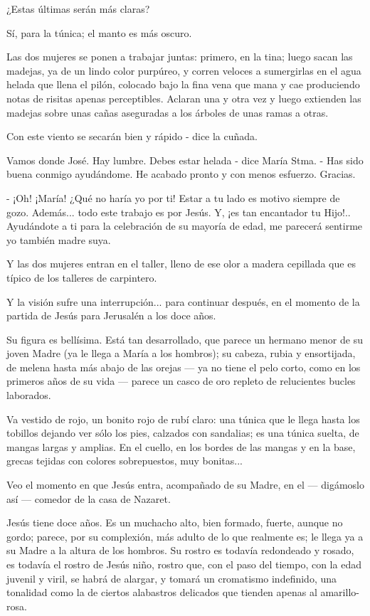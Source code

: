 \documentclass[12pt, twoside, openright]{book} %
\begin{document}
¿Estas últimas serán más claras? 

Sí, para la túnica; el manto es más oscuro. 

Las dos mujeres se ponen a trabajar juntas: primero, en la tina; luego sacan las madejas, ya de un lindo color purpúreo, y corren veloces a sumergirlas en el agua helada que llena el pilón, colocado bajo la fina vena que mana y cae produciendo notas de risitas apenas perceptibles. Aclaran una y otra vez y luego extienden las madejas sobre unas cañas aseguradas a los árboles de unas ramas a otras. 

Con este viento se secarán bien y rápido - dice la cuñada. 

Vamos donde José. Hay lumbre. Debes estar helada - dice María Stma. - Has sido buena conmigo ayudándome. He acabado pronto y con menos esfuerzo. Gracias. 

- ¡Oh! ¡María! ¿Qué no haría yo por ti! Estar a tu lado es motivo siempre de gozo. Además... todo este trabajo es por Jesús. Y, ¡es tan encantador tu Hijo!.. Ayudándote a ti para la celebración de su mayoría de edad, me parecerá sentirme yo también madre suya. 

Y las dos mujeres entran en el taller, lleno de ese olor a madera cepillada que es típico de los talleres de carpintero. 

Y la visión sufre una interrupción... para continuar después, en el momento de la partida de Jesús para Jerusalén a los doce años. 

Su figura es bellísima. Está tan desarrollado, que parece un hermano menor de su joven Madre (ya le llega a María a los hombros); su cabeza, rubia y ensortijada, de melena hasta más abajo de las orejas — ya no tiene el pelo corto, como en los primeros años de su vida — parece un casco de oro repleto de relucientes bucles laborados. 

Va vestido de rojo, un bonito rojo de rubí claro: una túnica que le llega hasta los tobillos dejando ver sólo los pies, calzados con sandalias; es una túnica suelta, de mangas largas y amplias. En el cuello, en los bordes de las mangas y en la base, grecas tejidas con colores sobrepuestos, muy bonitas... 

Veo el momento en que Jesús entra, acompañado de su Madre, en el — digámoslo así — comedor de la casa de Nazaret. 

Jesús tiene doce años. Es un muchacho alto, bien formado, fuerte, aunque no gordo; parece, por su complexión, más adulto de lo que realmente es; le llega ya a su Madre a la altura de los hombros. Su rostro es todavía redondeado y rosado, es todavía el rostro de Jesús niño, rostro que, con el paso del tiempo, con la edad juvenil y viril, se habrá de alargar, y tomará un cromatismo indefinido, una tonalidad como la de ciertos alabastros delicados que tienden apenas al amarillo- rosa. 
\end{document}
